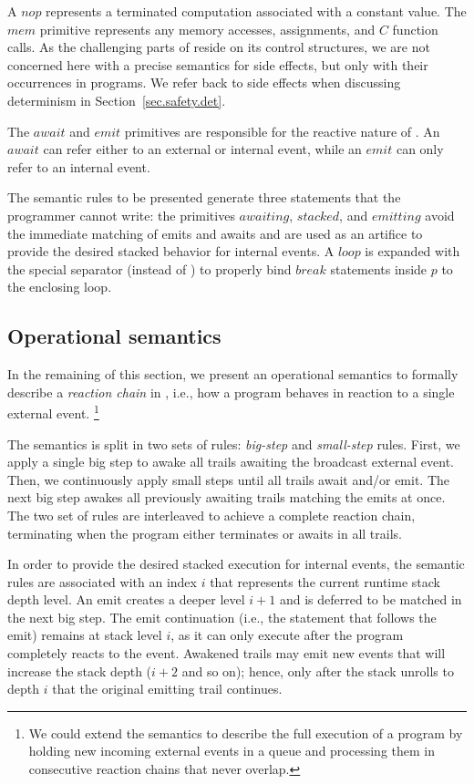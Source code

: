 A $nop$ represents a terminated computation associated with a constant value.
The $mem$ primitive represents any memory accesses, assignments, and $C$ 
function calls.
As the challenging parts of \CEU reside on its control structures, we are not 
concerned here with a precise semantics for side effects, but only with their 
occurrences in programs.
We refer back to side effects when discussing determinism in 
Section~\ref{sec.safety.det}.

The $await$ and $emit$ primitives are responsible for the reactive nature of 
\CEU.
An $await$ can refer either to an external or internal event, while an $emit$ 
can only refer to an internal event.

The semantic rules to be presented generate three statements that the 
programmer cannot write:
the primitives $awaiting$, $stacked$, and $emitting$ avoid the immediate 
matching of emits and awaits and are used as an artifice to provide the desired 
stacked behavior for internal events.
A $loop$ is expanded with the special  separator (instead of 
) to properly bind $break$ statements inside $p$ to the enclosing 
loop.
\subsection{Operational semantics}
\label{sec.sem}

In the remaining of this section, we present an operational semantics to 
formally describe a \emph{reaction chain} in \CEU, i.e., how a program behaves 
in reaction to a single external event.%
\footnote{We could extend the semantics to describe the full execution of a 
program by holding new incoming external events in a queue and processing them 
in consecutive reaction chains that never overlap.}

The semantics is split in two sets of rules: \emph{big-step} and 
\emph{small-step} rules.
First, we apply a single big step to awake all trails awaiting the broadcast 
external event.
Then, we continuously apply small steps until all trails await and/or emit.
The next big step awakes all previously awaiting trails matching the emits at 
once.
The two set of rules are interleaved to achieve a complete reaction chain, 
terminating when the program either terminates or awaits in all trails.

In order to provide the desired stacked execution for internal events, the 
semantic rules are associated with an index $i$ that represents the current 
runtime stack depth level.
An emit creates a deeper level $i+1$ and is deferred to be matched in the next 
big step.
The emit continuation (i.e., the statement that follows the emit) remains at 
stack level $i$, as it can only execute after the program completely reacts to 
the event.
Awakened trails may emit new events that will increase the stack depth ($i+2$ 
and so on);
hence, only after the stack unrolls to depth $i$ that the original emitting 
trail continues.

